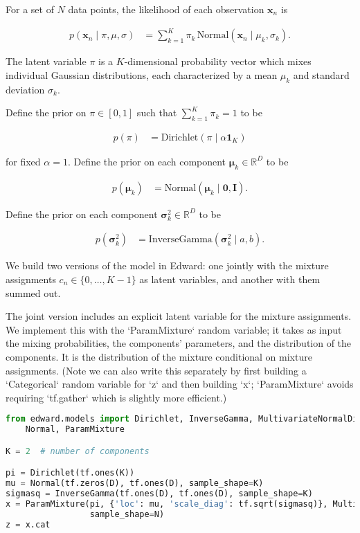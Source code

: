 For a set of $N$ data points,
the likelihood of each observation $\mathbf{x}_n$ is

\begin{align*}
  p(\mathbf{x}_n \mid \pi, \mu, \sigma)
  &=
  \sum_{k=1}^K \pi_k \, \text{Normal}(\mathbf{x}_n \mid \mu_k, \sigma_k).
\end{align*}

The latent variable $\pi$ is a $K$-dimensional probability vector
which mixes individual Gaussian distributions, each
characterized by a mean $\mu_k$ and standard deviation $\sigma_k$.

Define the prior on $\pi\in[0,1]$ such that $\sum_{k=1}^K\pi_k=1$ to be

\begin{align*}
  p(\pi)
  &=
  \text{Dirichlet}(\pi \mid \alpha \mathbf{1}_{K})
\end{align*}

for fixed $\alpha=1$. Define the prior on each component $\mathbf{\mu}_k\in\mathbb{R}^D$ to be

\begin{align*}
  p(\mathbf{\mu}_k)
  &=
  \text{Normal}(\mathbf{\mu}_k \mid \mathbf{0}, \mathbf{I}).
\end{align*}

Define the prior on each component $\mathbf{\sigma}_k^2\in\mathbb{R}^D$ to be

\begin{align*}
  p(\mathbf{\sigma}_k^2)
  &=
  \text{InverseGamma}(\mathbf{\sigma}_k^2 \mid a, b).
\end{align*}

We build two versions of the model in Edward: one jointly with the
mixture assignments $c_n\in\{0,\ldots,K-1\}$ as latent variables,
and another with them summed out.

The joint version includes an explicit latent variable for the mixture
assignments. We implement this with the `ParamMixture` random
variable; it takes as input the mixing probabilities, the components'
parameters, and the distribution of the components. It is the
distribution of the mixture conditional on mixture assignments. (Note
we can also write this separately by first building a `Categorical`
random variable for `z` and then building `x`; `ParamMixture` avoids
requiring `tf.gather` which is slightly more efficient.)

\begin{lstlisting}[language=Python]
from edward.models import Dirichlet, InverseGamma, MultivariateNormalDiag, \
    Normal, ParamMixture

K = 2  # number of components

pi = Dirichlet(tf.ones(K))
mu = Normal(tf.zeros(D), tf.ones(D), sample_shape=K)
sigmasq = InverseGamma(tf.ones(D), tf.ones(D), sample_shape=K)
x = ParamMixture(pi, {'loc': mu, 'scale_diag': tf.sqrt(sigmasq)}, MultivariateNormalDiag,
                 sample_shape=N)
z = x.cat
\end{lstlisting}

